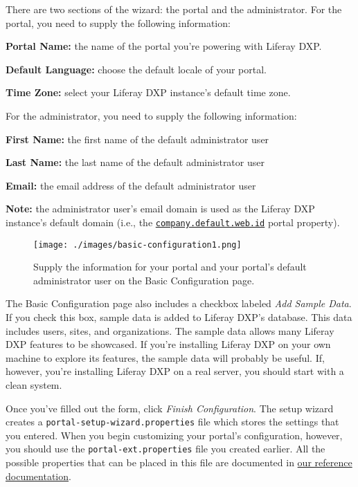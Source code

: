 There are two sections of the wizard: the portal and the administrator.
For the portal, you need to supply the following information:

\textbf{Portal Name:} the name of the portal you're powering with
Liferay DXP.

\textbf{Default Language:} choose the default locale of your portal.

\textbf{Time Zone:} select your Liferay DXP instance's default time
zone.

For the administrator, you need to supply the following information:

\textbf{First Name:} the first name of the default administrator user

\textbf{Last Name:} the last name of the default administrator user

\textbf{Email:} the email address of the default administrator user

\noindent\hrulefill

\textbf{Note:} the administrator user's email domain is used as the
Liferay DXP instance's default domain (i.e., the
\href{@platform-ref@/7.0-latest/propertiesdoc/portal.properties.html\#Company}{\texttt{company.default.web.id}}
portal property).

\noindent\hrulefill

\begin{figure}
\centering
\texttt{[image: ./images/basic-configuration1.png]}
\caption{Supply the information for your portal and your portal's
default administrator user on the Basic Configuration page.}
\end{figure}

The Basic Configuration page also includes a checkbox labeled \emph{Add
Sample Data}. If you check this box, sample data is added to Liferay
DXP's database. This data includes users, sites, and organizations. The
sample data allows many Liferay DXP features to be showcased. If you're
installing Liferay DXP on your own machine to explore its features, the
sample data will probably be useful. If, however, you're installing
Liferay DXP on a real server, you should start with a clean system.

Once you've filled out the form, click \emph{Finish Configuration}. The
setup wizard creates a \texttt{portal-setup-wizard.properties} file
which stores the settings that you entered. When you begin customizing
your portal's configuration, however, you should use the
\texttt{portal-ext.properties} file you created earlier. All the
possible properties that can be placed in this file are documented in
\href{@platform-ref@/7.0-latest/propertiesdoc}{our reference
documentation}.

